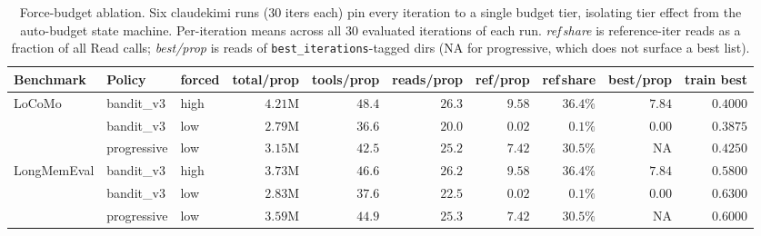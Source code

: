 \begin{table}[t]
\centering
\small
\caption{Force-budget ablation. Six claudekimi runs ($30$ iters each)
pin every iteration to a single budget tier, isolating tier effect from
the auto-budget state machine. Per-iteration means across all $30$
evaluated iterations of each run. \emph{ref\,share} is reference-iter
reads as a fraction of all Read calls; \emph{best/prop} is reads of
\texttt{best\_iterations}-tagged dirs (NA for progressive, which does
not surface a best list).}
\label{tab:force_budget}
\begin{tabular}{@{}lllrrrrrrr@{}}
\toprule
Benchmark & Policy & forced & total/prop & tools/prop & reads/prop & ref/prop & ref\,share & best/prop & train best \\
\midrule
\multirow{3}{*}{LoCoMo}      & bandit\_v3      & high & $4.21$M & $48.4$ & $26.3$ & $9.58$  & $36.4\%$ & $\mathbf{7.84}$ & $\mathbf{0.4000}$ \\
                              & bandit\_v3      & low  & $2.79$M & $36.6$ & $20.0$ & $\mathbf{0.02}$ & $\mathbf{0.1\%}$ & $\mathbf{0.00}$ & $0.3875$ \\
                              & progressive    & low  & $3.15$M & $42.5$ & $25.2$ & $7.42$  & $30.5\%$ & NA      & $0.4250$ \\
\midrule
\multirow{3}{*}{LongMemEval} & bandit\_v3      & high & $3.73$M & $46.6$ & $26.2$ & $9.58$  & $36.4\%$ & $7.84$  & $0.5800$ \\
                              & bandit\_v3      & low  & $2.83$M & $37.6$ & $22.5$ & $\mathbf{0.02}$ & $\mathbf{0.1\%}$ & $0.00$  & $\mathbf{0.6300}$ \\
                              & progressive    & low  & $3.59$M & $44.9$ & $25.3$ & $7.42$  & $30.5\%$ & NA      & $0.6000$ \\
\bottomrule
\end{tabular}
\end{table}
